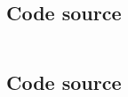 \documentclass{article}
\begin{document}

\newpage
\section{}\label{app:spectrum_comparison}
\subsection{Code source}\label{app:spectrum_comparison_code}
\paragraph{}
\lstset{language=C++}
\begin{lstlisting}
\end{lstlisting}

\subsection{Code source}\label{app:spectrum_comparison_cmake}
\paragraph{}
\lstset{language=C++}
\begin{lstlisting}
\end{lstlisting}
\end{document}
